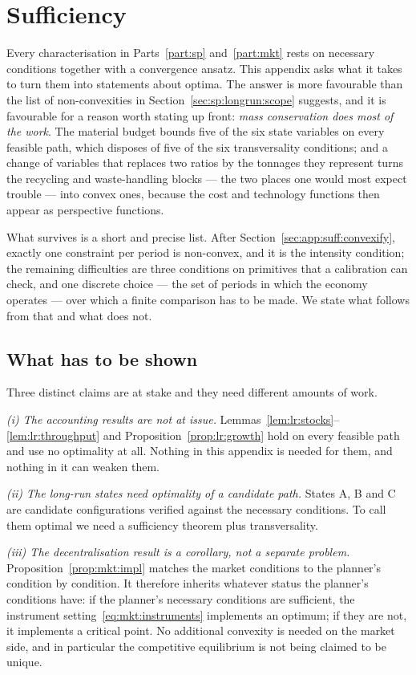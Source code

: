 \section{Sufficiency}\label{sec:app:suff}

Every characterisation in Parts~\ref{part:sp} and~\ref{part:mkt} rests on necessary conditions together with a convergence ansatz. This appendix asks what it takes to turn them into statements about optima. The answer is more favourable than the list of non-convexities in Section~\ref{sec:sp:longrun:scope} suggests, and it is favourable for a reason worth stating up front: \emph{mass conservation does most of the work}. The material budget bounds five of the six state variables on every feasible path, which disposes of five of the six transversality conditions; and a change of variables that replaces two ratios by the tonnages they represent turns the recycling and waste-handling blocks --- the two places one would most expect trouble --- into convex ones, because the cost and technology functions then appear as perspective functions.

What survives is a short and precise list. After Section~\ref{sec:app:suff:convexify}, exactly one constraint per period is non-convex, and it is the intensity condition; the remaining difficulties are three conditions on primitives that a calibration can check, and one discrete choice --- the set of periods in which the economy operates --- over which a finite comparison has to be made. We state what follows from that and what does not.

\subsection{What has to be shown}\label{sec:app:suff:what}

Three distinct claims are at stake and they need different amounts of work.

\emph{(i) The accounting results are not at issue.} Lemmas~\ref{lem:lr:stocks}--\ref{lem:lr:throughput} and Proposition~\ref{prop:lr:growth} hold on every feasible path and use no optimality at all. Nothing in this appendix is needed for them, and nothing in it can weaken them.

\emph{(ii) The long-run states need optimality of a candidate path.} States A, B and C are candidate configurations verified against the necessary conditions. To call them optimal we need a sufficiency theorem plus transversality.

\emph{(iii) The decentralisation result is a corollary, not a separate problem.} Proposition~\ref{prop:mkt:impl} matches the market conditions to the planner's condition by condition. It therefore inherits whatever status the planner's conditions have: if the planner's necessary conditions are sufficient, the instrument setting~\eqref{eq:mkt:instruments} implements an optimum; if they are not, it implements a critical point. No additional convexity is needed on the market side, and in particular the competitive equilibrium is not being claimed to be unique.

